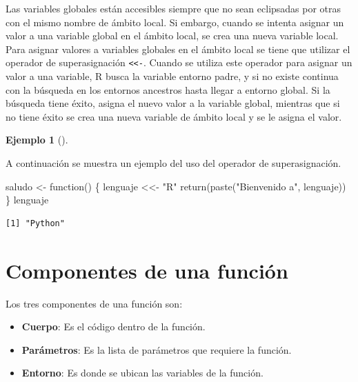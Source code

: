 \documentclass[
  a4paper,
]{scrreport}
\newenvironment{Shaded}{\begin{snugshade}}{\end{snugshade}}
\newcommand{\ControlFlowTok}[1]{\textcolor[rgb]{0.00,0.23,0.31}{#1}}
\newcommand{\FunctionTok}[1]{\textcolor[rgb]{0.28,0.35,0.67}{#1}}
\newcommand{\NormalTok}[1]{\textcolor[rgb]{0.00,0.23,0.31}{#1}}
\newcommand{\OtherTok}[1]{\textcolor[rgb]{0.00,0.23,0.31}{#1}}
\newcommand{\StringTok}[1]{\textcolor[rgb]{0.13,0.47,0.30}{#1}}
\providecommand{\tightlist}{%
  \setlength{\itemsep}{0pt}\setlength{\parskip}{0pt}}\usepackage{longtable,booktabs,array}
\theoremstyle{definition}
\newtheorem{example}{Ejemplo}[chapter]
\theoremstyle{definition}
\theoremstyle{remark}
\begin{document}
Las variables globales están accesibles siempre que no sean eclipsadas
por otras con el mismo nombre de ámbito local. Si embargo, cuando se
intenta asignar un valor a una variable global en el ámbito local, se
crea una nueva variable local. Para asignar valores a variables globales
en el ámbito local se tiene que utilizar el operador de superasignación
\texttt{\textless{}\textless{}-}. Cuando se utiliza este operador para
asignar un valor a una variable, R busca la variable entorno padre, y si
no existe continua con la búsqueda en los entornos ancestros hasta
llegar a entorno global. Si la búsqueda tiene éxito, asigna el nuevo
valor a la variable global, mientras que si no tiene éxito se crea una
nueva variable de ámbito local y se le asigna el valor.

\leavevmode{}%
\begin{example}[]\label{exm-superasignacion}

A continuación se muestra un ejemplo del uso del operador de
superasignación.

\begin{Shaded}
\begin{Highlighting}[]
\NormalTok{saludo }\OtherTok{\textless{}{-}} \ControlFlowTok{function}\NormalTok{() \{}
\NormalTok{  lenguaje }\OtherTok{\textless{}\textless{}{-}} \StringTok{"R"}
  \FunctionTok{return}\NormalTok{(}\FunctionTok{paste}\NormalTok{(}\StringTok{"Bienvenido a"}\NormalTok{, lenguaje))}
\NormalTok{\}}
\NormalTok{lenguaje}
\end{Highlighting}
\end{Shaded}

\begin{verbatim}
[1] "Python"
\end{verbatim}

\end{example}

\hypertarget{componentes-de-una-funciuxf3n}{%
\section{Componentes de una
función}\label{componentes-de-una-funciuxf3n}}

Los tres componentes de una función son:

\begin{itemize}
\tightlist
\item
  \textbf{Cuerpo}: Es el código dentro de la función.
\item
  \textbf{Parámetros}: Es la lista de parámetros que requiere la
  función.
\item
  \textbf{Entorno}: Es donde se ubican las variables de la función.
\end{itemize}
\end{document}
